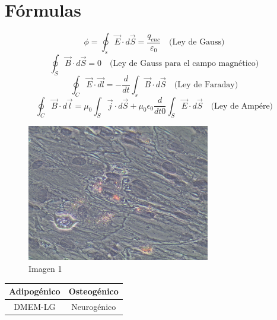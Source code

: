 \documentclass[a4paper,openright,12pt]{report}
\begin{document}
\section*{Fórmulas}

\begin{equation}
\phi = \oint_s \vec{E} \cdot d\vec{S} = \frac{q_{enc}}{\varepsilon_0} \quad \textrm {(Ley de Gauss)} 
\end{equation}
\begin{equation}
\oint_S \vec{B} \cdot d\vec{S} = 0 \quad \textrm {(Ley de Gauss para el campo magnético)} 
\end{equation}
\begin{equation}
\oint_C \vec{E} \cdot \vec{dl} = - \frac{d}{dt} \int_s \vec{B} \cdot d\vec{S} \quad \textrm {(Ley de Faraday)} 
\end{equation}
\begin{equation}
\oint_C \vec{B}\cdot d\vec{l} =\mu_0 \int_S \vec{j} \cdot d\vec{S} + \mu_0 \epsilon_0 \frac{d}{dt0} \int_S \vec{E} \cdot d\vec{S} \quad \textrm {(Ley de Ampére)} 
\end{equation}


\begin{figure}[htb]
\begin{center}
\includegraphics[width=8cm]{Cel1}
\caption{Imagen 1}
\end{center}
\end{figure}

\begin{tabular}{|c|c|}
\hline 
Adipogénico & Osteogénico \\ 
\hline 
DMEM-LG & Neurogénico \\ 
\hline 
\end{tabular} 

\afterpage{\newpage}
\newpage


\afterpage{\null\newpage}
\end{document}
